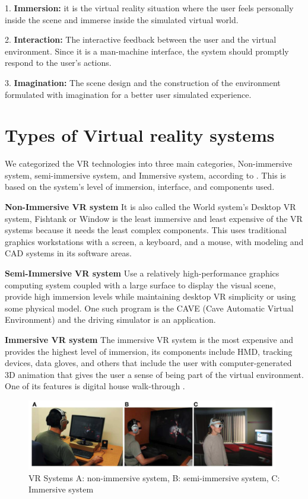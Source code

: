 1. \textbf{Immersion:} it is the virtual reality situation where the user feels personally inside the
scene and immerse inside the simulated virtual world.



2. \textbf{Interaction:} The interactive feedback between the user
and the virtual environment. Since it is a man-machine
interface, the system should promptly respond to the
user’s actions.




3. \textbf{Imagination:} The scene design and the construction of
the environment formulated with imagination for a
better user simulated experience.

\section{Types of Virtual reality systems}
We categorized the VR technologies into three main categories, Non-immersive system, semi-immersive system, and Immersive system, according to \cite{Bamodu2013VirtualComponents}. This is based on the system's level of immersion, interface, and components used.  

\textbf{Non-Immersive VR system}
It is also called the World system's Desktop VR system, Fishtank or Window is the least immersive and least expensive of the VR systems because it needs the least complex components. This uses traditional graphics workstations with a screen, a keyboard, and a mouse, with modeling and CAD systems in its software areas.  

\textbf{Semi-Immersive VR system}
Use a relatively high-performance graphics computing system coupled with a large surface to display the visual scene, provide high immersion levels while maintaining desktop VR simplicity or using some physical model. One such program is the CAVE (Cave Automatic Virtual Environment) and the driving simulator is an application. 

\textbf{Immersive VR system}
 The immersive VR system is the most expensive and provides the highest level of immersion, its components include HMD, tracking devices, data gloves, and others that include the user with computer-generated 3D animation that gives the user a sense of being part of the virtual environment. One of its features is digital house walk-through \citep{Bamodu2013VirtualComponents, Baus2014MovingReview}.

\begin{figure}[ht]
    \centering
    \includegraphics[width=0.98\textwidth]{images/vrsystem.png}
    \caption{VR Systems A: non-immersive system, B: semi-immersive system, C: Immersive system \citep{Baus2014MovingReview}}
    \label{fig:vrsys}
\end{figure}




